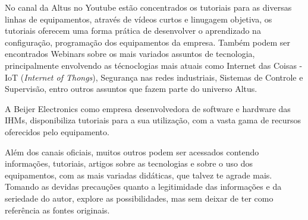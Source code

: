 No canal da Altus no Youtube estão concentrados os tutoriais para as diversas linhas de equipamentos, através de vídeos curtos e linugagem objetiva, os tutoriais oferecem uma forma prática de desenvolver o aprendizado na configuração, programação dos equipamentos da empresa. Também podem ser encontrados Webinars sobre os mais variados assuntos de tecnologia, principalmente envolvendo as técnoclogias mais atuais como Internet das Coisas - IoT (\textit{Internet of Thongs}), Segurança nas redes industriais, Sistemas de Controle e Supervisão, entro outros assuntos que fazem parte do universo Altus. 


A Beijer Electronics 
como empresa desenvolvedora de software e hardware das \acrshort{IHM}s, disponibiliza tutoriais para a sua utilização, com a vasta gama de recursos oferecidos pelo equipamento.


\begin{figure}[ht!]
	\centering
\end{figure}





Além dos canais oficiais, muitos outros podem ser acessados contendo informações, tutoriais, artigos sobre as tecnologias e sobre o uso dos equipamentos, 
com as mais variadas didáticas, que talvez te agrade mais. 
Tomando as devidas precauções quanto a legitimidade das informações e da seriedade do autor, explore as possibilidades, mas sem deixar de ter como referência as fontes originais. 




